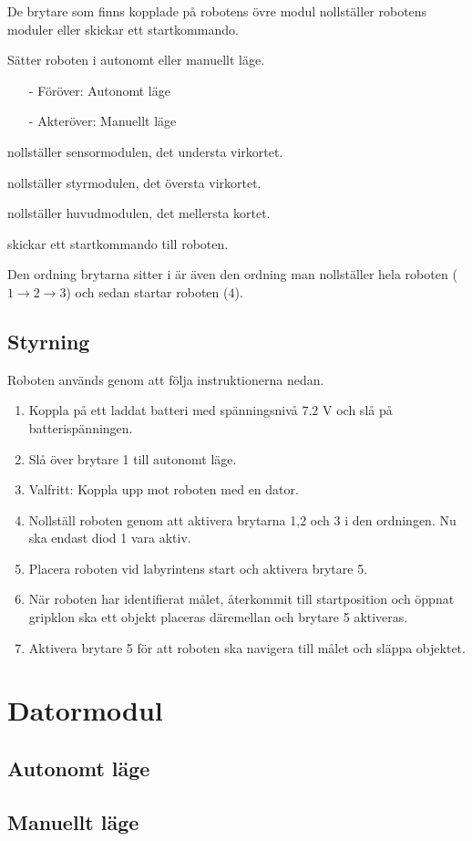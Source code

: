 \documentclass[11pt]{article}
\begin{document}
De brytare som finns kopplade på robotens övre modul nollställer robotens moduler eller skickar ett startkommando. 
\begin{description}[style=unboxed, leftmargin=0cm]
  \item[Brytare 1] Sätter roboten i autonomt eller manuellt läge. 
    \begin{itemize}
      \setlength\itemsep{-0.5em}
      \item[-] Föröver: Autonomt läge
      \item[-] Akteröver: Manuellt läge
    \end{itemize}
  \item[Brytare 2] nollställer sensormodulen, det understa virkortet.
  \item[Brytare 3] nollställer styrmodulen, det översta virkortet.
  \item[Brytare 4] nollställer huvudmodulen, det mellersta kortet.
  \item[Brytare 5] skickar ett startkommando till roboten.
\end{description}

Den ordning brytarna sitter i är även den ordning man nollställer hela roboten ($1 \rightarrow 2 \rightarrow 3$) och sedan startar roboten ($4$).

\subsection{Styrning}
Roboten används genom att följa instruktionerna nedan.
\begin{enumerate}
    \renewcommand*\labelenumi{\theenumi\vspace{1pt} - }
  \item Koppla på ett laddat batteri med spänningsnivå $7.2$ V och slå på batterispänningen.
  \item Slå över brytare 1 till autonomt läge.
    \renewcommand*\labelenumi{(\theenumi)\vspace{1pt} - }
  \item Valfritt: Koppla upp mot roboten med en dator.
    \renewcommand*\labelenumi{\theenumi\vspace{1pt} - }
  \item Nollställ roboten genom att aktivera brytarna 1,2 och 3 i den ordningen. Nu ska endast diod 1 vara aktiv.
  \item Placera roboten vid labyrintens start och aktivera brytare 5. 
  \item När roboten har identifierat målet, återkommit till startposition och öppnat gripklon ska ett objekt placeras däremellan och brytare 5 aktiveras.
  \item Aktivera brytare 5 för att roboten ska navigera till målet och släppa objektet. 
\end{enumerate}


\section{Datormodul}
\subsection{Autonomt läge}
\subsection{Manuellt läge}
\end{document}
